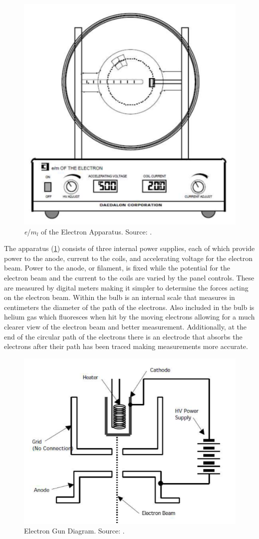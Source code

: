 \documentclass[prX,nofootinbib,notitlepage]{revtex4-1}
\begin{document}
\begin{figure}[ht]
        \centering
        \includegraphics[width=0.5\linewidth]{exp 2 apparatus figure.png}
        \caption{\textit{e}/\textit{$m_l$} of the Electron Apparatus. Source: \cite{PHYS506}.}
        \label{fig:Figure 1}
\end{figure}

The apparatus (\ref{fig:Figure 1}) consists of three internal power supplies, each of which provide power to the anode, current to the coils, and accelerating voltage for the electron beam. Power to the anode, or filament, is fixed while the potential for the electron beam and the current to the coils are varied by the panel controls. These are measured by digital meters making it simpler to determine the forces acting on the electron beam. Within the bulb is an internal scale that measures in centimeters the diameter of the path of the electrons. Also included in the bulb is helium gas which fluoresces when hit by the moving electrons allowing for a much clearer view of the electron beam and better measurement. Additionally, at the end of the circular path of the electrons there is an electrode that absorbs the electrons after their path has been traced making measurements more accurate. 

\begin{figure}[h!]
    \centering
    \includegraphics[width=0.5\linewidth]{exp 2 electron gun figure.png}
    \caption{Electron Gun Diagram. Source: \cite{PHYS506}.}
    \label{fig:Figure 2}
\end{figure}
\end{document}
